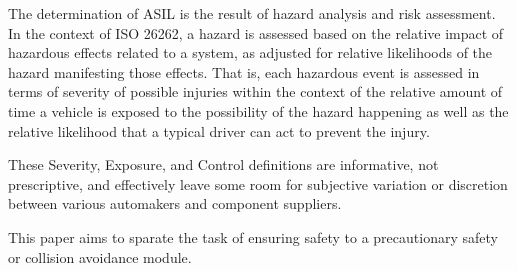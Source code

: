  The determination of ASIL is the result of hazard analysis and risk assessment. In the context of ISO 26262, a hazard is assessed based on the relative impact of hazardous effects related to a system, as adjusted for relative likelihoods of the hazard manifesting those effects. That is, each hazardous event is assessed in terms of severity of possible injuries within the context of the relative amount of time a vehicle is exposed to the possibility of the hazard happening as well as the relative likelihood that a typical driver can act to prevent the injury.
 
 These Severity, Exposure, and Control definitions are informative, not prescriptive, and effectively leave some room for subjective variation or discretion between various automakers and component suppliers.
 
 This paper aims to sparate the task of ensuring safety to a precautionary safety or collision avoidance module. 
 
 

